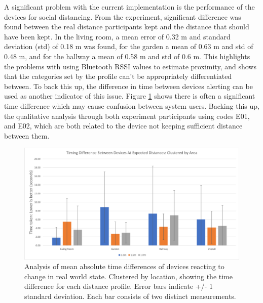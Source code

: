 \documentclass{l4proj}
\begin{document}
A significant problem with the current implementation is the performance of the devices for social distancing. From the experiment, significant difference was found between the real distance participants kept and the distance that should have been kept. In the living room, a mean error of 0.32 m and standard deviation (std) of 0.18 m was found, for the garden a mean of 0.63 m and std of 0.48 m, and for the hallway a mean of 0.58 m and std of 0.6 m. This highlights the problems with using Bluetooth RSSI values to estimate proximity, and shows that the categories set by the profile can't be appropriately differentiated between. To back this up, the difference in time between devices alerting can be used as another indicator of this issue. Figure \ref{fig:clustered-time-diff} shows there is often a significant time difference which may cause confusion between system users. Backing this up, the qualitative analysis through both experiment participants using codes E01, and E02, which are both related to the device not keeping sufficient distance between them.

\begin{figure}[!htb]
    \centering
    \includegraphics[width=0.8\linewidth]{images/clustered-time-diff.png}

    \caption{ Analysis of mean absolute time differences of devices reacting to change in real world state. Clustered by location, showing the time difference for each distance profile. Error bars indicate +/- 1 standard deviation. Each bar consists of two distinct measurements. }

    \label{fig:clustered-time-diff}
\end{figure}
\end{document}

